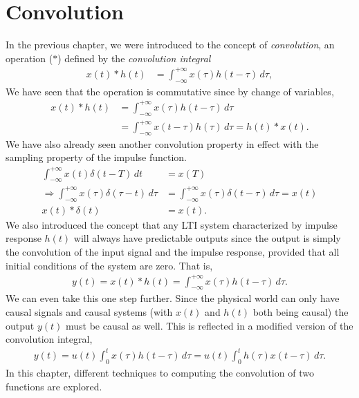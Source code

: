 \documentclass{report}
\begin{document}
\setcounter{chapter}{2}
\chapter{Convolution}
In the previous chapter, we were introduced to the concept of \emph{convolution}, an operation ($*$) defined by the \emph{convolution integral}
\begin{align*}
    x(t) * h(t) &= \int_{-\infty}^{+\infty} x(\tau)h(t-\tau) \,d\tau,
\end{align*}
We have seen that the operation is commutative since by change of variables, 
\begin{align*}
    x(t) * h(t) &= \int_{-\infty}^{+\infty} x(\tau)h(t-\tau) \,d\tau \\
    &= \int_{-\infty}^{+\infty} x(t-\tau)h(\tau) \,d\tau = h(t) * x(t).
\end{align*}
We have also already seen another convolution property in effect with the sampling property of the impulse function. 
\begin{align*}
    \int_{-\infty}^{+\infty} x(t)\delta(t-T) \,dt &= x(T) \\
    \Longrightarrow \int_{-\infty}^{+\infty} x(\tau)\delta(\tau-t) \,d\tau &= \int_{-\infty}^{+\infty} x(\tau)\delta(t-\tau) \,d\tau = x(t) \\
    x(t) * \delta(t) &= x(t).
\end{align*}
We also introduced the concept that any LTI system characterized by impulse response $h(t)$ will always have predictable outputs since the output is simply the 
convolution of the input signal and the impulse response, provided that all initial conditions of the system are zero. That is, 
\begin{align}
    y(t) = x(t) * h(t) = \int_{-\infty}^{+\infty} x(\tau)h(t-\tau) \,d\tau.
\end{align}
We can even take this one step further. Since the physical world can only have causal signals and causal systems (with $x(t)$ and $h(t)$ both being causal) the output $y(t)$ must be causal as well. 
This is reflected in a modified version of the convolution integral, 
\begin{align}
    y(t) = u(t) \int_{0}^{t} x(\tau)h(t-\tau) \,d\tau = u(t) \int_{0}^{t} h(\tau)x(t-\tau) \,d\tau.
\end{align}
In this chapter, different techniques to computing the convolution of two functions are explored. 
\end{document}
